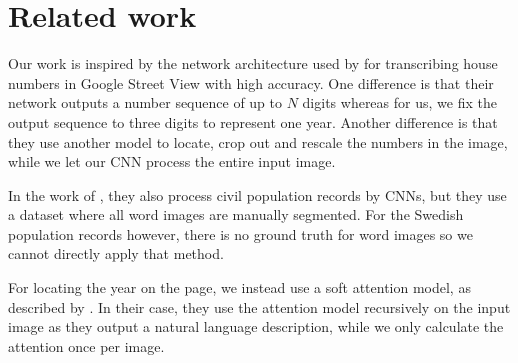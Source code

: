 
\section{Related work}

Our work is inspired by the network architecture used by \textcite{multidigit_streetview} for transcribing house numbers in Google Street View with high accuracy. One difference is that their network outputs a number sequence of up to $N$ digits whereas for us, we fix the output sequence to three digits to represent one year. Another difference is that they use another model to locate, crop out and rescale the numbers in the image, while we let our CNN process the entire input image.

In the work of \textcite{FornesCnnCategorization}, they also process civil population records by CNNs, but they use a dataset where all word images are manually segmented. For the Swedish population records however, there is no ground truth for word images so we cannot directly apply that method.

For locating the year on the page, we instead use a soft attention model, as described by \textcite{AttendAndTell}. In their case, they use the attention model recursively on the input image as they output a natural language description, while we only calculate the attention once per image.
